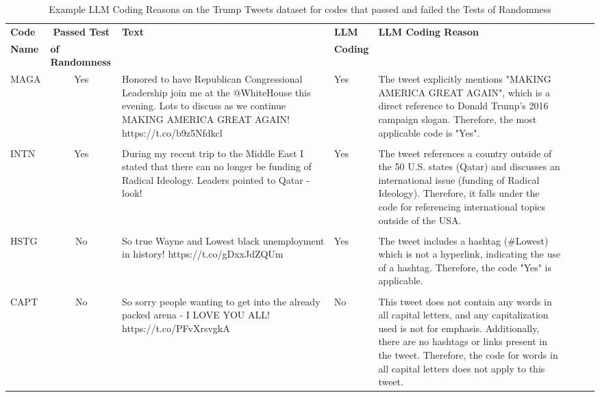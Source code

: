 \documentclass{article}
\begin{document}
\begin{table}[!htb]
\caption{Example LLM Coding Reasons on the Trump Tweets dataset for codes that passed and failed the Tests of Randomness}
\vspace*{2.5mm}
\begin{tabular}{@{}lcp{4.5cm}p{1cm}p{5.5cm}lcl@{}}
\toprule
\textbf{Code} &
  \textbf{Passed Test} &
  \multirow{2}{*}{\textbf{Text}} &
  \textbf{LLM} &
  \multirow{2}{*}{\textbf{LLM Coding Reason}} \\
\textbf{Name} &
  \multicolumn{1}{l}{\textbf{of Randomness}} &
   &
  \multicolumn{1}{l}{\textbf{Coding}} &
   \\ \midrule
MAGA &
  Yes &
  Honored to have Republican Congressional Leadership join me at the @WhiteHouse this evening. Lots to discuss as we continue MAKING AMERICA GREAT AGAIN! https://t.co/b9z5Nfdkcl &
  Yes &
  The tweet explicitly mentions "MAKING AMERICA GREAT AGAIN", which is a direct reference to Donald Trump's 2016 campaign slogan. Therefore, the most applicable code is "Yes". \\ \\
INTN &
  Yes &
  During   my recent trip to the Middle East I stated that there can no longer be funding of Radical Ideology. Leaders pointed to Qatar - look! &
  Yes &
  The   tweet references a country outside of the 50 U.S. states (Qatar) and   discusses an international issue (funding of Radical Ideology). Therefore, it   falls under the code for referencing international topics outside of the USA. \\ \\
HSTG &
  No &
  So   true Wayne and Lowest black unemployment in history! https://t.co/gDxxJdZQUm &
  Yes &
  The   tweet includes a hashtag (\#Lowest) which is not a hyperlink, indicating the   use of a hashtag. Therefore, the code "Yes" is applicable. \\ \\
CAPT &
  No &
  So   sorry people wanting to get into the already packed arena - I LOVE YOU ALL! https://t.co/PFvXrsvgkA &
  No &
  This   tweet does not contain any words in all capital letters, and any   capitalization used is not for emphasis. Additionally, there are no hashtags   or links present in the tweet. Therefore, the code for words in all capital   letters does not apply to this tweet. \\ \bottomrule
\end{tabular}
\label{tab:tab3}
\end{table}
\end{document}

